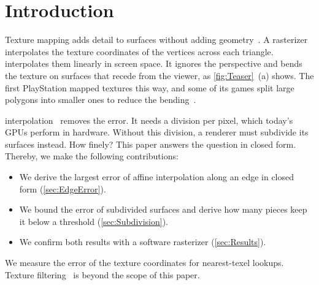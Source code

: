 \section{Introduction}\label{sec:Introduction}
\glsresetall

Texture mapping adds detail to surfaces without adding geometry~\cite{Catmull74SAC}.
A rasterizer interpolates the texture coordinates of the vertices across each triangle.
 interpolates them linearly in screen space.
It ignores the perspective and bends the texture on surfaces that recede from the viewer, as \cref{fig:Teaser}~(a) shows.
The first PlayStation mapped textures this way, and some of its games split large polygons into smaller ones to reduce the bending~\cite{Copetti19PAP}.

 interpolation~\cite{Heckbert91IPT,Blinn92HI} removes the error.
It needs a division per pixel, which today's \acp{GPU} perform in hardware.
Without this division, a renderer must subdivide its surfaces instead.
How finely?
This paper answers the question in closed form.
Thereby, we make the following contributions:
\begin{itemize}
    \item We derive the largest error of affine interpolation along an edge in closed form (\cref{sec:EdgeError}).
    \item We bound the error of subdivided surfaces and derive how many pieces keep it below a threshold (\cref{sec:Subdivision}).
    \item We confirm both results with a software rasterizer (\cref{sec:Results}).
\end{itemize}
We measure the error of the texture coordinates for nearest-texel lookups.
Texture filtering~\cite{Williams83PP} is beyond the scope of this paper.
